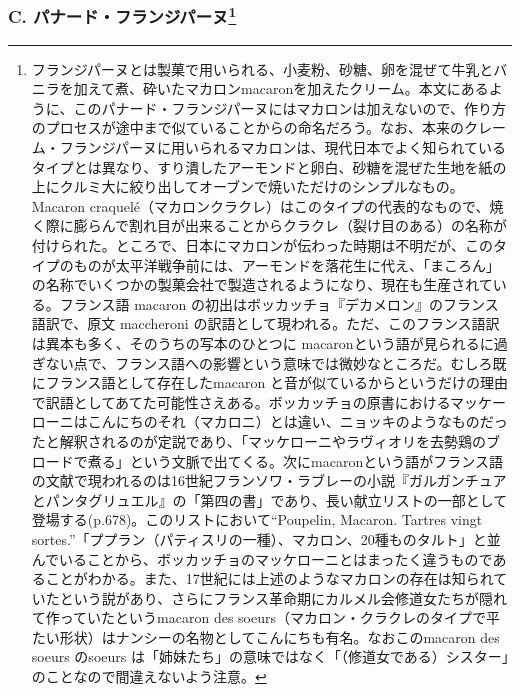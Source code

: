 \begin{recette}
{\subsubsection[C. パナード・フランジパーヌ]{\texorpdfstring{C.
パナード・フランジパーヌ\footnote{フランジパーヌとは製菓で用いられる、小麦粉、砂糖、卵を混ぜて牛乳とバニラを加えて煮、砕いたマカロンmacaronを加えたクリーム。本文にあるように、このパナード・フランジパーヌにはマカロンは加えないので、作り方のプロセスが途中まで似ていることからの命名だろう。なお、本来のクレーム・フランジパーヌに用いられるマカロンは、現代日本でよく知られているタイプとは異なり、すり潰したアーモンドと卵白、砂糖を混ぜた生地を紙の上にクルミ大に絞り出してオーブンで焼いただけのシンプルなもの。Macaron
  craquelé（マカロンクラクレ）はこのタイプの代表的なもので、焼く際に膨らんで割れ目が出来ることからクラクレ（裂け目のある）の名称が付けられた。ところで、日本にマカロンが伝わった時期は不明だが、このタイプのものが太平洋戦争前には、アーモンドを落花生に代え、「まころん」の名称でいくつかの製菓会社で製造されるようになり、現在も生産されている。フランス語
  macaron の初出はボッカッチョ『デカメロン』のフランス語訳で、原文
  maccheroni
  の訳語として現われる。ただ、このフランス語訳は異本も多く、そのうちの写本のひとつに
  macaronという語が見られるに過ぎない点で、フランス語への影響という意味では微妙なところだ。むしろ既にフランス語として存在したmacaron
  と音が似ているからというだけの理由で訳語としてあてた可能性さえある。ボッカッチョの原書におけるマッケーローニはこんにちのそれ（マカロニ）とは違い、ニョッキのようなものだったと解釈されるのが定説であり、「マッケローニやラヴィオリを去勢鶏のブロードで煮る」という文脈で出てくる。次にmacaronという語がフランス語の文献で現われるのは16世紀フランソワ・ラブレーの小説『ガルガンチュアとパンタグリュエル』の「第四の書」であり、長い献立リストの一部として登場する(p.678)。このリストにおいて``Poupelin,
  Macaron. Tartres vingt
  sortes.''「ププラン（パティスリの一種）、マカロン、20種ものタルト」と並んでいることから、ボッカッチョのマッケローニとはまったく違うものであることがわかる。また、17世紀には上述のようなマカロンの存在は知られていたという説があり、さらにフランス革命期にカルメル会修道女たちが隠れて作っていたというmacaron
  des
  soeurs（マカロン・クラクレのタイプで平たい形状）はナンシーの名物としてこんにちも有名。なおこのmacaron
  des soeurs のsoeurs
  は「姉妹たち」の意味ではなく「（修道女である）シスター」のことなので間違えないよう注意。}}{C. パナード・フランジパーヌ}}\label{panade-c}}

\begin{frsubenv}


\end{frsubenv}
\end{recette}
